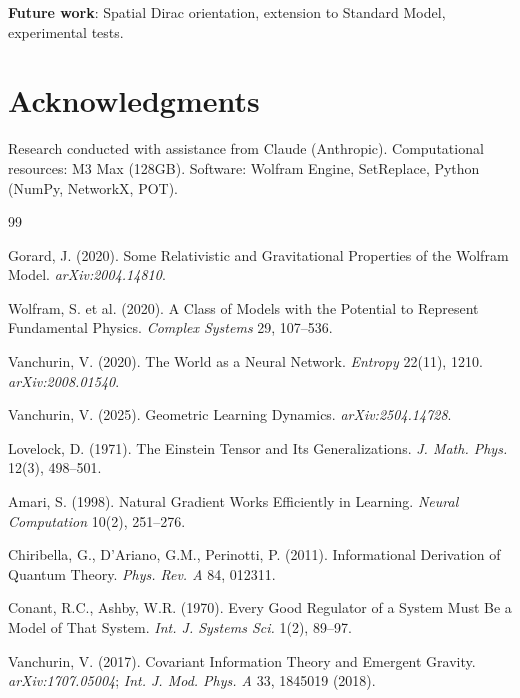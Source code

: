 \documentclass[11pt]{article}
\theoremstyle{definition}
\theoremstyle{remark}
\begin{document}
\textbf{Future work}: Spatial Dirac orientation, extension to Standard Model, experimental tests.

\section*{Acknowledgments}

Research conducted with assistance from Claude (Anthropic). Computational resources: M3 Max (128GB). Software: Wolfram Engine, SetReplace, Python (NumPy, NetworkX, POT).

\begin{thebibliography}{99}

Gorard, J. (2020). Some Relativistic and Gravitational Properties of the Wolfram Model. \textit{arXiv:2004.14810}.

Wolfram, S. et al. (2020). A Class of Models with the Potential to Represent Fundamental Physics. \textit{Complex Systems} 29, 107--536.

Vanchurin, V. (2020). The World as a Neural Network. \textit{Entropy} 22(11), 1210. \textit{arXiv:2008.01540}.

Vanchurin, V. (2025). Geometric Learning Dynamics. \textit{arXiv:2504.14728}.

Lovelock, D. (1971). The Einstein Tensor and Its Generalizations. \textit{J. Math. Phys.} 12(3), 498--501.

Amari, S. (1998). Natural Gradient Works Efficiently in Learning. \textit{Neural Computation} 10(2), 251--276.

Chiribella, G., D'Ariano, G.M., Perinotti, P. (2011). Informational Derivation of Quantum Theory. \textit{Phys. Rev. A} 84, 012311.

Conant, R.C., Ashby, W.R. (1970). Every Good Regulator of a System Must Be a Model of That System. \textit{Int. J. Systems Sci.} 1(2), 89--97.

Vanchurin, V. (2017). Covariant Information Theory and Emergent Gravity. \textit{arXiv:1707.05004}; \textit{Int. J. Mod. Phys. A} 33, 1845019 (2018).

\end{thebibliography}
\end{document}
